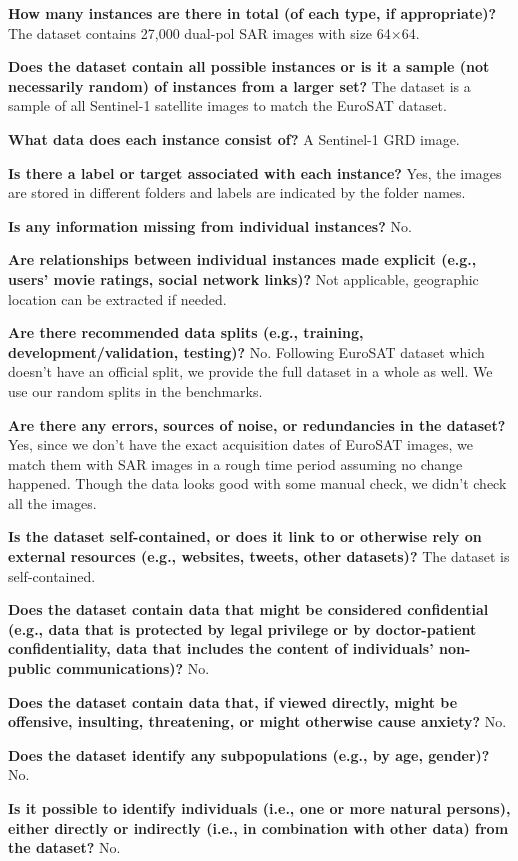 \documentclass[lettersize,journal]{IEEEtran}
\begin{document}
\textbf{How many instances are there in total (of each type, if appropriate)?} The dataset contains 27,000 dual-pol SAR images with size 64$\times$64.

\textbf{Does the dataset contain all possible instances or is it a sample (not necessarily random) of instances from a larger set?} The dataset is a sample of all Sentinel-1 satellite images to match the EuroSAT dataset.

\textbf{What data does each instance consist of?} A Sentinel-1 GRD image.

\textbf{Is there a label or target associated with each instance?} Yes, the images are stored in different folders and labels are indicated by the folder names.

\textbf{Is any information missing from individual instances?} No.

\textbf{Are relationships between individual instances made explicit (e.g., users’ movie ratings, social network links)?} Not applicable, geographic location can be extracted if needed.

\textbf{Are there recommended data splits (e.g., training, development/validation, testing)?} No. Following EuroSAT dataset which doesn't have an official split, we provide the full dataset in a whole as well. We use our random splits in the benchmarks.

\textbf{Are there any errors, sources of noise, or redundancies in the dataset?} Yes, since we don't have the exact acquisition dates of EuroSAT images, we match them with SAR images in a rough time period assuming no change happened. Though the data looks good with some manual check, we didn't check all the images.

\textbf{Is the dataset self-contained, or does it link to or otherwise rely on external resources (e.g.,
websites, tweets, other datasets)?} The dataset is self-contained.

\textbf{Does the dataset contain data that might be considered confidential (e.g., data that is protected by legal privilege or by doctor-patient confidentiality, data that includes the content of individuals’ non-public communications)?} No.

\textbf{Does the dataset contain data that, if viewed directly, might be offensive, insulting, threatening, or might otherwise cause anxiety?} No.

\textbf{Does the dataset identify any subpopulations (e.g., by age, gender)?} No.

\textbf{Is it possible to identify individuals (i.e., one or more natural persons), either directly or indirectly (i.e., in combination with other data) from the dataset?} No.
\end{document}

